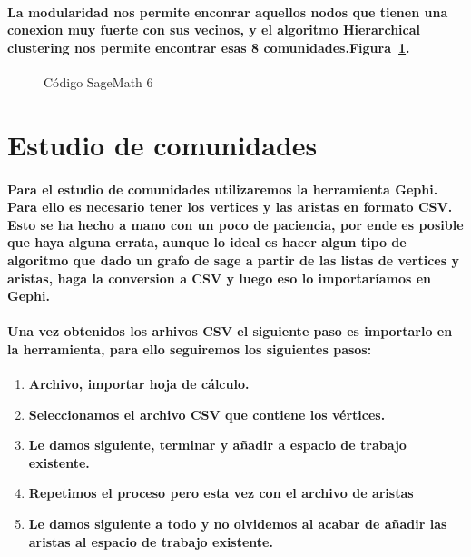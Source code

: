 \documentclass[11pt,spanish]{article}
\begin{document}
\paragraph*{La modularidad nos permite enconrar aquellos nodos que tienen una conexion muy fuerte con sus vecinos, 
y el algoritmo Hierarchical clustering nos permite encontrar esas 8 comunidades.Figura~\ref{fig:codigoSage6}.}
\begin{figure}[H]
	\begin{center}
%
	   
%
	\end{center}
	\caption{%
	Código SageMath 6
 	}%
	\label{fig:codigoSage6}
\end{figure}


\section{Estudio de comunidades}
\paragraph*{Para el estudio de comunidades utilizaremos la herramienta Gephi. 
Para ello es necesario tener los vertices y las aristas en formato CSV.
Esto se ha hecho a mano con un poco de paciencia, por ende es posible que haya alguna errata, 
aunque lo ideal es hacer algun tipo de algoritmo que dado un grafo de sage  a partir de las listas de vertices y aristas,
haga la conversion a CSV y luego eso lo importaríamos en Gephi.}

\paragraph*{Una vez obtenidos los arhivos CSV el siguiente paso es importarlo en la herramienta, para ello seguiremos los siguientes pasos:}
\begin{enumerate}
	\item \textbf{Archivo, importar hoja de cálculo.}
	\item \textbf{Seleccionamos el archivo CSV que contiene los vértices.}
	\item \textbf{Le damos siguiente, terminar y añadir a espacio de trabajo existente.}
	\item \textbf{Repetimos el proceso pero esta vez con el archivo de aristas}
	\item \textbf{Le damos siguiente a todo y no olvidemos al acabar de añadir las aristas al espacio de trabajo existente.}
\end{enumerate}
\end{document}
